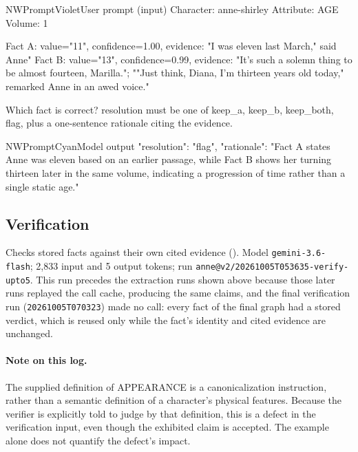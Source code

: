 \begin{nwprompt}{NWPromptViolet}{User prompt (input)}
Character: anne-shirley
Attribute: AGE
Volume: 1

Fact A: value="11", confidence=1.00, evidence: "I was eleven last March," said Anne"
Fact B: value="13", confidence=0.99, evidence: "It's such a solemn thing to be almost fourteen, Marilla."; ""Just think, Diana, I'm thirteen years old today," remarked Anne in an awed voice."

Which fact is correct? resolution must be one of keep_a, keep_b, keep_both, flag, plus a one-sentence rationale citing the evidence.
\end{nwprompt}

\begin{nwprompt}{NWPromptCyan}{Model output}
{
  "resolution": "flag",
  "rationale": "Fact A states Anne was eleven based on an earlier passage, while Fact B shows her turning thirteen later in the same volume, indicating a progression of time rather than a single static age."
}
\end{nwprompt}

\subsection*{Verification}
Checks stored facts against their own cited evidence (\sys). Model \texttt{gemini-3.6-flash}; 2,833 input and 5 output tokens; run \nolinkurl{anne@v2/20261005T053635-verify-upto5}. This run precedes the extraction runs shown above because those later runs replayed the call cache, producing the same claims, and the final verification run (\nolinkurl{20261005T070323}) made no call: every fact of the final graph had a stored verdict, which is reused only while the fact's identity and cited evidence are unchanged.

\paragraph{Note on this log.} The supplied definition of APPEARANCE is a
canonicalization instruction, rather than a semantic definition of a character's physical
features. Because the verifier is explicitly told to judge by that definition, this is
a defect in the verification input, even though the exhibited claim is accepted. The
example alone does not quantify the defect's impact.

